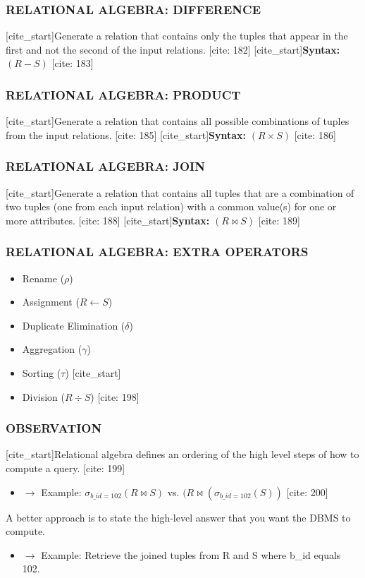 \documentclass[aspectratio=169]{beamer}
\begin{document}
\begin{frame}
    \frametitle{RELATIONAL ALGEBRA: DIFFERENCE}
    [cite_start]Generate a relation that contains only the tuples that appear in the first and not the second of the input relations. [cite: 182]
    \vspace{1em}
    [cite_start]\textbf{Syntax:} $(R - S)$ [cite: 183]
\end{frame}

\begin{frame}
    \frametitle{RELATIONAL ALGEBRA: PRODUCT}
    [cite_start]Generate a relation that contains all possible combinations of tuples from the input relations. [cite: 185]
    \vspace{1em}
    [cite_start]\textbf{Syntax:} $(R \times S)$ [cite: 186]
\end{frame}

\begin{frame}
    \frametitle{RELATIONAL ALGEBRA: JOIN}
    [cite_start]Generate a relation that contains all tuples that are a combination of two tuples (one from each input relation) with a common value(s) for one or more attributes. [cite: 188]
    \vspace{1em}
    [cite_start]\textbf{Syntax:} $(R \bowtie S)$ [cite: 189]
\end{frame}

\begin{frame}
    \frametitle{RELATIONAL ALGEBRA: EXTRA OPERATORS}
    \begin{itemize}
        \item Rename ($\rho$)
        \item Assignment ($R \leftarrow S$)
        \item Duplicate Elimination ($\delta$)
        \item Aggregation ($\gamma$)
        \item Sorting ($\tau$)
        [cite_start]\item Division ($R \div S$) [cite: 198]
    \end{itemize}
\end{frame}

\begin{frame}
    \frametitle{OBSERVATION}
    [cite_start]Relational algebra defines an ordering of the high level steps of how to compute a query. [cite: 199]
    \begin{itemize}
        [cite_start]\item $\rightarrow$ Example: $\sigma_{b\_id=102}(R \bowtie S)$ vs. $(R \bowtie (\sigma_{b\_id=102}(S))$ [cite: 200]
    \end{itemize}
    A better approach is to state the high-level answer that you want the DBMS to compute.
    \begin{itemize}
        \item $\rightarrow$ Example: Retrieve the joined tuples from R and S where b\_id equals 102.
    \end{itemize}
\end{frame}
\end{document}
